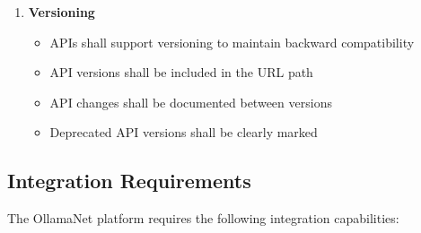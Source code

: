 \begin{enumerate}
   \item \textbf{Versioning}
   \begin{itemize}
      \item APIs shall support versioning to maintain backward compatibility
      \item API versions shall be included in the URL path
      \item API changes shall be documented between versions
      \item Deprecated API versions shall be clearly marked
   \end{itemize}
\end{enumerate}

\subsection{Integration Requirements}

The OllamaNet platform requires the following integration capabilities:

